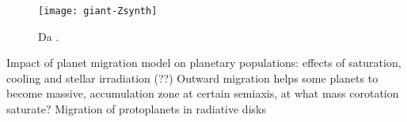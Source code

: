 \begin{figure}[!ht]
\texttt{[image: giant-Zsynth]}
\caption{Da \cite{mordasini2018planetary}. }
\end{figure}




\begin{workout}
Impact of planet migration model on planetary populations: effects of saturation, cooling and stellar irradiation (??)
Outward migration helps some planets to become massive, accumulation zone at certain semiaxis, at what mass corotation saturate?
Migration of protoplanets in radiative disks
\end{workout}
